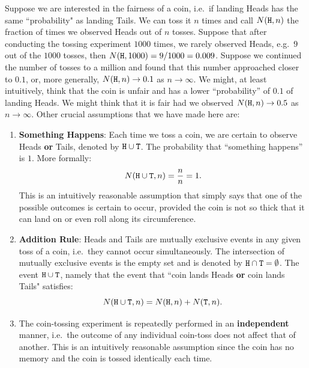 \begin{idea}
Suppose we are interested in the fairness of a coin, i.e.~if landing Heads has the same ``probability" as landing Tails.  We can toss it $n$ times and call 
$N({\tt H},n)$ the fraction of times we observed Heads out of $n$ tosses.
Suppose that after conducting the tossing experiment $1000$ times, we rarely observed Heads, e.g.~$9$ out of the $1000$ tosses, then $N({\tt H},1000)=9/1000=0.009$.  Suppose we continued the number of tosses to a million and found that this number approached closer to $0.1$, or, more generally, $N({\tt H},n) \to 0.1$ as $n \to \infty$.  We might, at least intuitively, think that the coin is unfair and has a lower ``probability'' of $0.1$ of landing Heads.  We might think that it is fair had we observed $N({\tt H},n) \to 0.5$ as $n \to \infty$.  Other crucial assumptions that we have made here are:
\begin{enumerate}
\item {\bf Something Happens}: Each time we toss a coin, we are certain to observe Heads {\bf or} Tails, denoted by ${\tt H} \cup {\tt T}$.  The probability that ``something happens'' is $1$.  More formally:
\[
N({\tt H} \cup {\tt T},n)= \frac{n}{n} = 1.
\]
This is an intuitively reasonable assumption that simply says that one of the possible outcomes is certain to occur, provided the coin is not so thick that it can land on or even roll along its circumference.

\item {\bf Addition Rule}: Heads and Tails are mutually exclusive events in any given toss of a coin, i.e.~they cannot occur simultaneously.  The intersection of mutually exclusive events is the empty set and is denoted by ${\tt H} \cap {\tt T} = \emptyset$. The event ${\tt H} \cup {\tt T}$, namely that the event that ``coin lands Heads {\bf or} coin lands Tails" satisfies:
\[
N({\tt H} \cup {\tt T},n)= N({\tt H},n) + N({\tt T},n) .
\]
\item The coin-tossing experiment is repeatedly performed in an {\bf independent} manner, i.e.~the outcome of any individual coin-toss does not affect that of another.  This is an intuitively reasonable assumption since the coin has no memory and the coin is tossed identically each time.
\end{enumerate}
\end{idea}

